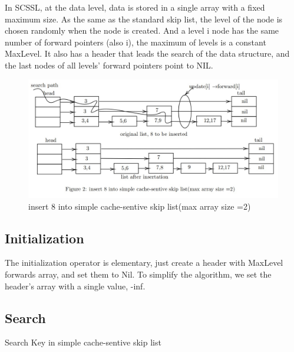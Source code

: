 \documentclass[sigconf, nonacm, letterpaper,top=2cm,bottom=2cm,left=3cm,right=3cm,marginparwidth=1.75cm]{acmart}
\begin{document}
In SCSSL, at the data level, data is stored in a single array with a fixed maximum size. As the same as the standard skip list, the level of the node is chosen randomly when the node is created. And a level i node has the same number of forward pointers (also i), the maximum of levels is a constant MaxLevel. It also has a header that leads the search of the data structure, and the last nodes of all levels’ forward pointers point to NIL.


\begin{figure}
      \centering
  \includegraphics[width=\linewidth]{figures/skipinsert.jpg}
\caption{insert 8 into simple cache-sentive skip list(max array size =2)}
\label{fig:fig2}
\end{figure}

\subsection{Initialization}
The initialization operator is elementary, just create a header with MaxLevel forwards array, and set them to Nil. To simplify the algorithm, we set the header's array with a single value, -inf.


\subsection{Search}
\begin{algorithm}
    \caption{Search Key in simple cache-sentive skip list}
\end{algorithm}
\end{document}
